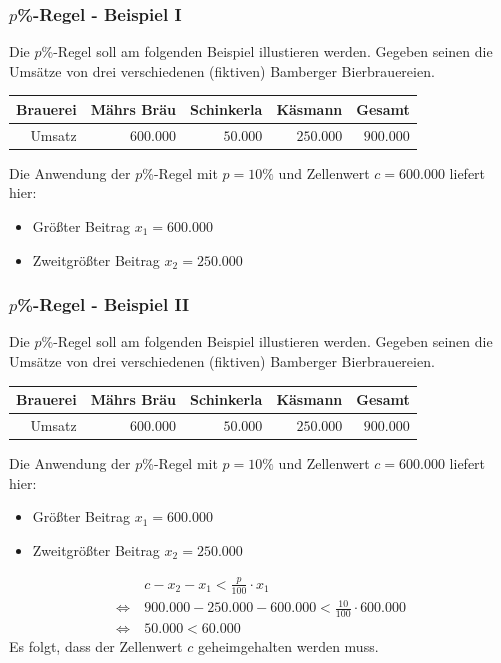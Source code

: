 \documentclass[aspectratio=169]{beamer}
\begin{document}
\begin{frame}
    \frametitle{$p$\%-Regel - Beispiel I}
    Die $p$\%-Regel soll am folgenden Beispiel illustieren werden. Gegeben seinen die Umsätze von drei verschiedenen (fiktiven) Bamberger Bierbrauereien.
    \begin{center}
        \begin{tabular}{ r r r r r }
            \textbf{Brauerei} \vline & \textbf{Mährs Bräu} & \textbf{Schinkerla} & \textbf{Käsmann} & \textbf{Gesamt} \\ 
            \hline
            Umsatz \vline & $600.000$ & $50.000$ & $250.000$ & $900.000$
           \end{tabular}
    \end{center}
    Die Anwendung der $p$\%-Regel mit $p = 10 \%$ und Zellenwert $c = 600.000$ liefert hier:
    \begin{itemize}
        \item Größter Beitrag $x_1 = 600.000$
        \item Zweitgrößter Beitrag $x_2 = 250.000$
    \end{itemize}
\end{frame}


\begin{frame}
    \frametitle{$p$\%-Regel - Beispiel II}
    Die $p$\%-Regel soll am folgenden Beispiel illustieren werden. Gegeben seinen die Umsätze von drei verschiedenen (fiktiven) Bamberger Bierbrauereien.
    \begin{center}
        \begin{tabular}{ r r r r r }
            \textbf{Brauerei} \vline & \textbf{Mährs Bräu} & \textbf{Schinkerla} & \textbf{Käsmann} & \textbf{Gesamt} \\ 
            \hline
            Umsatz \vline & $600.000$ & $50.000$ & $250.000$ & $900.000$
           \end{tabular}
    \end{center}
    Die Anwendung der $p$\%-Regel mit $p = 10 \%$ und Zellenwert $c = 600.000$ liefert hier:
    \begin{itemize}
        \item Größter Beitrag $x_1 = 600.000$
        \item Zweitgrößter Beitrag $x_2 = 250.000$
    \end{itemize}
    \begin{align}
        & c - x_2 - x_ 1 <  \frac{p}{100} \cdot x_1 \\
        \Leftrightarrow \: & 900.000 - 250.000 - 600.000 < \frac{10}{100} \cdot 600.000 \\
        \Leftrightarrow \: & 50.000 < 60.000
    \end{align}
    Es folgt, dass der Zellenwert $c$ geheimgehalten werden muss.
\end{frame}
\end{document}
